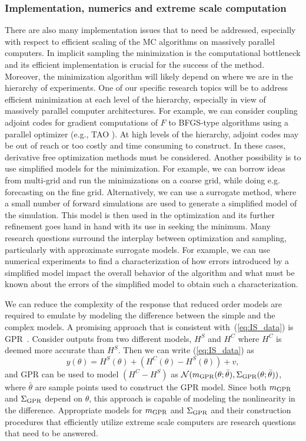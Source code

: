 \documentclass[11pt]{article}
\begin{document}
\subsubsection*{Implementation, numerics and extreme scale computation}
There are also many implementation issues that to need be addressed, especially with respect to efficient scaling of the MC algorithms on massively parallel computers.
In implicit sampling the minimization is the computational bottleneck and its efficient implementation is crucial for the success of the method.
Moreover, the minimization algorithm will likely depend on where we are in the hierarchy of experiments.
One of our specific research topics will be to address efficient minimization at each level of the hierarchy, especially in view of massively parallel computer architectures.
For example, we can consider coupling adjoint codes for gradient computations of $F$ to BFGS-type algorithms using a parallel optimizer (e.g., TAO \cite{tao-man}).
At high levels of the hierarchy, adjoint codes may be out of reach or too costly and time consuming to construct.
In these cases, derivative free optimization methods must be considered.
Another possibility is to use simplified models for the minimization.
For example, we can borrow ideas from multi-grid and run the minimizations on a coarse grid, while doing e.g. forecasting on the fine grid.
Alternatively, we can use a surrogate method, where a small number of forward simulations are used to generate a simplified model of the simulation.
This model is then used in the optimization and its further refinement goes hand in hand with its use in seeking the minimum.
Many research questions surround the interplay between optimization and sampling, particularly with approximate surrogate models.
For example, we can use numerical experiments to find a characterization of how errors introduced by a simplified model impact the overall behavior of the algorithm and what must be known about the errors of the simplified model to obtain such a characterization.  

We can reduce the complexity of the response that reduced order models
are required to emulate by modeling the difference between the simple
and the complex models. A promising approach that is consistent
with~(\ref{eq:IS_data}) is GPR~\cite{Rasmussen:2006vz}. 
Consider outputs from two different models, $H^S$ and $H^C$ where $H^C$ is deemed more accurate than $H^S$. 
Then we can write (\ref{eq:IS_data}) as 
\begin{equation}
y(\theta) = H^S(\theta) + (H^C(\theta) - H^S(\theta)) + v,
\end{equation}
and GPR can be used to model  $(H^C - H^S)$ as $\mathcal{N}(m_{\rm GPR}(\theta;\bar{\theta}),\Sigma_{\rm GPR}(\theta;\bar{\theta}))$, where $\bar{\theta}$ are sample points used to construct the GPR model. Since both $m_{\rm GPR}$ and $\Sigma_{\rm GPR}$ depend on $\theta$, this approach is capable of modeling the nonlinearity in the difference. Appropriate models for $m_{\rm GPR}$ and $\Sigma_{\rm GPR}$ and their construction procedures that efficiently utilize extreme scale computers are research questions that need to be answered. 
\end{document}
